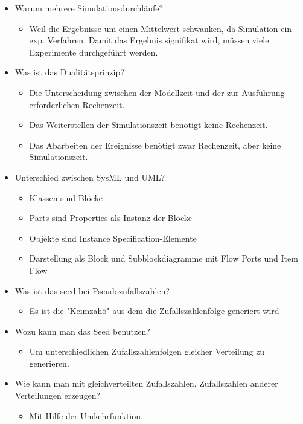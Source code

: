 \begin{itemize}
\begin{itemize}
    \end{itemize}  
     \item Warum mehrere Simulationsdurchläufe?
    \begin{itemize}
        \item Weil die Ergebnisse um einen Mittelwert schwanken, da Simulation ein exp. Verfahren.
        Damit das Ergebnis signifikat wird, müssen viele Experimente durchgeführt werden.
    \end{itemize}  
    \item Was ist das Dualitätsprinzip?
    \begin{itemize}
        \item Die Unterscheidung zwischen der Modellzeit und der zur Ausführung erforderlichen Rechenzeit.
        \item Das Weiterstellen der Simulationszeit benötigt keine Rechenzeit.
        \item Das Abarbeiten der Ereignisse benötigt zwar Rechenzeit, aber keine Simulationszeit.
    \end{itemize}  
     \item Unterschied zwischen SysML und UML?
    \begin{itemize}
        \item Klassen sind Blöcke
        \item Parts sind Properties als Instanz der Blöcke
        \item Objekte sind Instance Specification-Elemente
        \item Darstellung als Block und Subblockdiagramme mit Flow Ports und Item Flow
    \end{itemize}  
     \item Was ist das seed bei Pseudozufallszahlen?
    \begin{itemize}
        \item Es ist die "Keimzahö" aus dem die Zufallszahlenfolge generiert wird
    \end{itemize}  
     \item Wozu kann man das Seed benutzen?
    \begin{itemize}
        \item Um unterschiedlichen Zufallszahlenfolgen gleicher Verteilung zu generieren.
    \end{itemize} 
     \item Wie kann man mit gleichverteilten Zufallszahlen, Zufallszahlen anderer Verteilungen erzeugen?
    \begin{itemize}
        \item Mit Hilfe der Umkehrfunktion.

\end{itemize}
\end{itemize}
